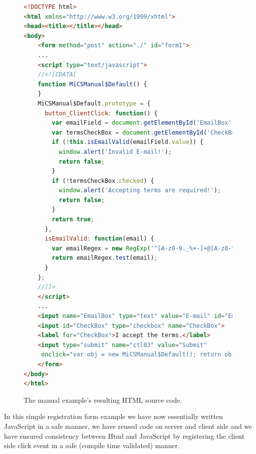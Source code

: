 \begin{figure}[H]
\begin{lstlisting}[language=html,style=HTMLJSStyle]
<!DOCTYPE html>
<html xmlns="http://www.w3.org/1999/xhtml">
<head><title></title></head>
<body>
    <form method="post" action="./" id="form1">
    ...
    <script type="text/javascript">
    //<![CDATA[
    function MiCSManual$Default() {
    }
    MiCSManual$Default.prototype = {
      button_ClientClick: function() {
        var emailField = document.getElementById('EmailBox');
        var termsCheckBox = document.getElementById('CheckBox');
        if (!this.isEmailValid(emailField.value)) {
          window.alert('Invalid E-mail!');
          return false;
        }
        if (!termsCheckBox.checked) {
          window.alert('Accepting terms are required!');
          return false;
        }
        return true;
      },
      isEmailValid: function(email) {
        var emailRegex = new RegExp('^[A-z0-9._%+-]+@[A-z0-9.-]+.[A-z]{2,4}$');
        return emailRegex.test(email);
      }
    };
    //]]>
    </script>
    ...
    <input name="EmailBox" type="text" value="E-mail" id="EmailBox">
    <input id="CheckBox" type="checkbox" name="CheckBox">
    <label for="CheckBox">I accept the terms.</label>
    <input type="submit" name="ctl03" value="Submit" 
     onclick="var obj = new MiCSManual$Default(); return obj.button_ClientClick();">
    </form>
</body>
</html>
\end{lstlisting}
\caption{The manual example's resulting HTML source code.}
\label{fig:manualHtmlSource}
\end{figure}

In this simple registration form example we have now essentially written JavaScript in a safe manner, we have reused code on server and client side and we have ensured consistency between Html and JavaScript by registering the client side click event in a safe (compile time validated) manner.

